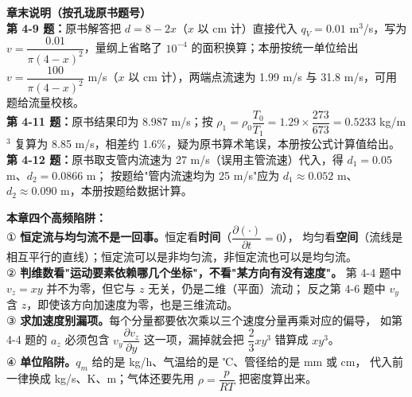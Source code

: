 \begin{tishi}
\textbf{章末说明（按孔珑原书题号）}\\
\textbf{第 4-9 题：}原书解答把 $d=8-2x$（$x$ 以 cm 计）直接代入 $q_V=0.01$ m$^3$/s，写为
$v=\dfrac{0.01}{\pi(4-x)^2}$，量纲上省略了 $10^{-4}$ 的面积换算；本册按统一单位给出
$v=\dfrac{100}{\pi(4-x)^2}$ m/s（$x$ 以 cm 计），两端点流速为 1.99 m/s 与 31.8 m/s，可用题给流量校核。\\
\textbf{第 4-11 题：}原书结果印为 8.987 m/s；按 $\rho_1=\rho_0\dfrac{T_0}{T_1}=1.29\times\dfrac{273}{673}=0.5233$ kg/m$^3$
复算为 8.85 m/s，相差约 1.6\%，疑为原书算术笔误，本册按公式计算值给出。\\
\textbf{第 4-12 题：}原书取支管内流速为 27 m/s（误用主管流速）代入，得 $d_1=0.05$ m、$d_2=0.0866$ m；
按题给"管内流速均为 25 m/s"应为 $d_1\approx0.052$ m、$d_2\approx0.090$ m，本册按题给数据计算。
\end{tishi}

\begin{yicuo}
\textbf{本章四个高频陷阱：}\\
① \textbf{恒定流与均匀流不是一回事。}恒定看\textbf{时间}（$\dfrac{\partial(\cdot)}{\partial t}=0$），
均匀看\textbf{空间}（流线是相互平行的直线）；恒定流可以是非均匀流，非恒定流也可以是均匀流。\\
② \textbf{判维数看"运动要素依赖哪几个坐标"，不看"某方向有没有速度"。}
第 4-4 题中 $v_z=xy$ 并不为零，但它与 $z$ 无关，仍是二维（平面）流动；
反之第 4-6 题中 $v_y$ 含 $z$，即使该方向加速度为零，也是三维流动。\\
③ \textbf{求加速度别漏项。}每个分量都要依次乘以三个速度分量再乘对应的偏导，
如第 4-4 题的 $a_z$ 必须包含 $v_y\dfrac{\partial v_z}{\partial y}$ 这一项，漏掉就会把
$\dfrac{2}{3}xy^3$ 错算成 $xy^3$。\\
④ \textbf{单位陷阱。}$q_m$ 给的是 kg/h、气温给的是 ℃、管径给的是 mm 或 cm，
代入前一律换成 kg/s、K、m；气体还要先用 $\rho=\dfrac{p}{RT}$ 把密度算出来。
\end{yicuo}
